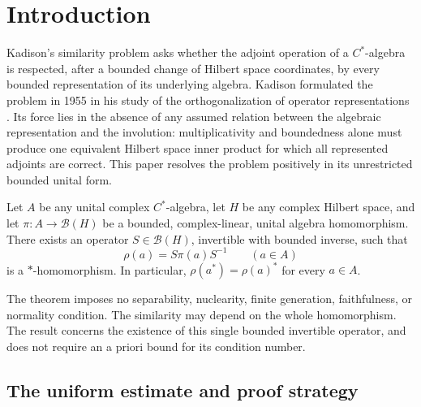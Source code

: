 \begin{abstract}
We prove that every bounded complex-linear unital algebra homomorphism from a unital
complex $C^*$-algebra into the bounded operators on an arbitrary Hilbert
space is similar to a $*$-homomorphism. This resolves Kadison's similarity
conjecture positively. We also obtain one universal hyperreflexivity constant
for all unital von Neumann algebras on arbitrary complex Hilbert spaces.
\end{abstract}

\section{Introduction}
\label{sec:introduction}

Kadison's similarity problem asks whether the adjoint operation of a
\(C^*\)-algebra is respected, after a bounded change of Hilbert space
coordinates, by every bounded representation of its underlying algebra.
Kadison formulated the problem in 1955 in his study of the
orthogonalization of operator representations \citep{Kadison1955}.
Its force lies in the absence of any assumed relation between the
algebraic representation and the involution: multiplicativity and
boundedness alone must produce one equivalent Hilbert space inner
product for which all represented adjoints are correct.  This paper
resolves the problem positively in its unrestricted bounded unital form.

\begin{theorem}[Similarity]\label{thm:similarity}
Let \(A\) be any unital complex \(C^*\)-algebra, let \(H\) be any complex
Hilbert space, and let \(\pi:A\to\mathcal B(H)\) be a bounded,
complex-linear, unital algebra homomorphism.  There exists an operator
\(S\in\mathcal B(H)\), invertible with bounded inverse, such that
\[
  \rho(a)=S\pi(a)S^{-1}\qquad(a\in A)
\]
is a \(*\)-homomorphism.  In particular,
\(\rho(a^*)=\rho(a)^*\) for every \(a\in A\).
\end{theorem}

The theorem imposes no separability, nuclearity, finite generation,
faithfulness, or normality condition.  The similarity may depend on the
whole homomorphism.  The result concerns the existence of this single
bounded invertible operator, and does not require an a priori bound for
its condition number.

\subsection{The uniform estimate and proof strategy}

